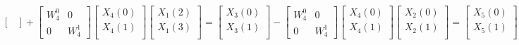 \documentclass[journal,12pt,twocolumn]{IEEEtran}
\renewcommand\thesection{\arabic{section}}
\begin{document}
\begin{enumerate}[label=\arabic*.,ref=\thesection.\theenumi]
\begin{solution}
$$\begin{equation}
\begin{bmatrix}
	\end{bmatrix}
	+
	\begin{bmatrix}
	W^{0}_{4} & 0\\
	0 & W^{1}_{4}
	\end{bmatrix}
	\begin{bmatrix}
	X_{4}(0) \\ 
	X_{4}(1) \\ 
	\end{bmatrix}
	\end{equation}
	\begin{equation}
	\begin{bmatrix}
	X_{1}(2) \\ 
	X_{1}(3)\\ 
	\end{bmatrix}
	=
	\begin{bmatrix}
	X_{3}(0) \\ 
	X_{3}(1)\\ 
	\end{bmatrix}
	-
	\begin{bmatrix}
	W^{0}_{4} & 0\\
	0 & W^{1}_{4}
	\end{bmatrix}
	\begin{bmatrix}
	X_{4}(0) \\ 
	X_{4}(1) \\ 
	\end{bmatrix}
	\end{equation}
	\begin{equation}
	\begin{bmatrix}
	X_{2}(0) \\ 
	X_{2}(1)\\ 
	\end{bmatrix}
	=
	\begin{bmatrix}
	X_{5}(0) \\ 
	X_{5}(1)\\ 
	\end{bmatrix}
	+
	\begin{bmatrix}
	W^{0}_{4} & 0\\
	0 & W^{1}_{4}
	\end{bmatrix}
	\begin{bmatrix}
	X_{6}(0) \\ 
	X_{6}(1) \\ 
	\end{bmatrix}
	\end{equation}
	\begin{equation}
	\begin{bmatrix}
	X_{2}(2) \\ 

\end{bmatrix}
\end{equation}$$
\end{solution}
\end{enumerate}
\end{document}
